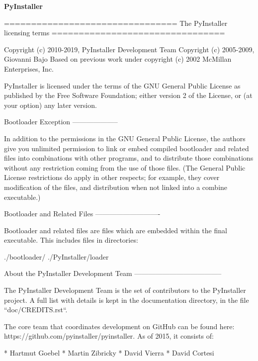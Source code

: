 \textbf{PyInstaller}

================================\newline
The PyInstaller licensing terms\newline
================================

Copyright (c) 2010-2019, PyInstaller Development Team\newline
Copyright (c) 2005-2009, Giovanni Bajo\newline
Based on previous work under copyright (c) 2002 McMillan Enterprises, Inc.

PyInstaller is licensed under the terms of the GNU General Public License
as published by the Free Software Foundation; either version 2 of the License,
or (at your option) any later version.

Bootloader Exception\newline
--------------------

In addition to the permissions in the GNU General Public License, the
authors give you unlimited permission to link or embed compiled bootloader
and related files into combinations with other programs, and to distribute
those combinations without any restriction coming from the use of those
files. (The General Public License restrictions do apply in other respects;
for example, they cover modification of the files, and distribution when
not linked into a combine executable.)

Bootloader and Related Files\newline
----------------------------

Bootloader and related files are files which are embedded within the
final executable. This includes files in directories:

./bootloader/\newline
./PyInstaller/loader

About the PyInstaller Development Team\newline
--------------------------------------

The PyInstaller Development Team is the set of contributors
to the PyInstaller project. A full list with details is kept
in the documentation directory, in the file
``doc/CREDITS.rst``.

The core team that coordinates development on GitHub can be found here:\newline
https://github.com/pyinstaller/pyinstaller.  As of 2015, it consists of:

* Hartmut Goebel\newline
* Martin Zibricky\newline
* David Vierra\newline
* David Cortesi

